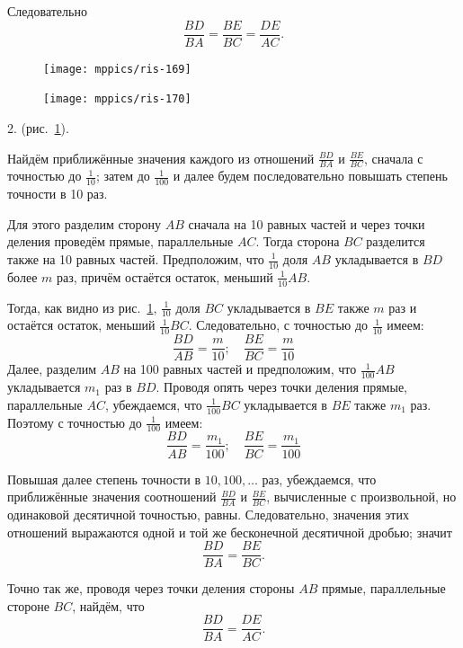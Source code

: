 \documentclass[oneside]{book}
\begin{document}
Следовательно
\[\frac{BD}{BA}=\frac{BE}{BC}=\frac{DE}{AC}.\]

\begin{figure}[h!]
\begin{minipage}{.48\textwidth}
\centering
\texttt{[image: mppics/ris-169]}
\caption{}\label{1938/ris-169}
\end{minipage}
\hfill
\begin{minipage}{.48\textwidth}
\centering
\texttt{[image: mppics/ris-170]}
\caption{}\label{1938/ris-170}
\end{minipage}
\end{figure}

2.  (рис.~\ref{1938/ris-170}).

Найдём приближённые значения каждого из отношений $\frac{BD}{BA}$ и $\frac{BE}{BC}$, сначала с точностью до $\tfrac1{10}$;
затем до $\tfrac1{100}$ и далее будем последовательно повышать степень точности в 10 раз.

Для этого разделим сторону $AB$ сначала на 10 равных частей и через точки деления проведём прямые, параллельные $AC$.
Тогда сторона $BC$ разделится также на 10 равных частей.
Предположим, что $\tfrac1{10}$ доля $AB$ укладывается в $BD$ более $m$
раз, причём остаётся остаток, меньший $\tfrac1{10}AB$.

Тогда, как видно из рис.~\ref{1938/ris-170}, $\tfrac1{10}$ доля $BC$ укладывается в $BE$ также $m$ раз и остаётся остаток, меньший $\tfrac1{10}BC$.
Следовательно, с точностью до $\tfrac1{10}$ имеем:
\[\frac{BD}{AB}=\frac{m}{10}; 
\quad
\frac{BE}{BC}=\frac{m}{10}\]
Далее, разделим $AB$ на 100 равных частей и предположим, что $\tfrac1{100}AB$ укладывается $m_1$ раз в $BD$.
Проводя опять через точки деления прямые, параллельные $AC$, убеждаемся, что $\tfrac1{100}BC$ укладывается в $BE$ также $m_1$ раз.
Поэтому с точностью до $\tfrac1{100}$ имеем:
\[\frac{BD}{AB}=\frac{m_1}{100}; 
\quad
\frac{BE}{BC}=\frac{m_1}{100}\]

Повышая далее степень точности в $10,100,\dots$ раз, убеждаемся, что приближённые значения соотношений $\frac{BD}{BA}$ и $\frac{BE}{BC}$, вычисленные с произвольной, но одинаковой десятичной точностью, равны.
Следовательно, значения этих отношений выражаются одной и той же бесконечной десятичной дробью;
значит
\[\frac{BD}{BA}=\frac{BE}{BC}.\]

Точно так же, проводя через точки деления стороны $AB$ прямые, параллельные стороне $BC$, найдём, что
\[\frac{BD}{BA}=\frac{DE}{AC}.\]
\end{document}
